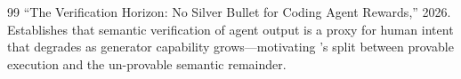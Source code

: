 \begin{thebibliography}{99}
``The Verification Horizon: No Silver Bullet for Coding Agent Rewards,'' 2026. Establishes that semantic verification of agent output is a proxy for human intent that degrades as generator capability grows---motivating \PoAI{}'s split between provable execution and the un-provable semantic remainder.

\end{thebibliography}

\appendix


